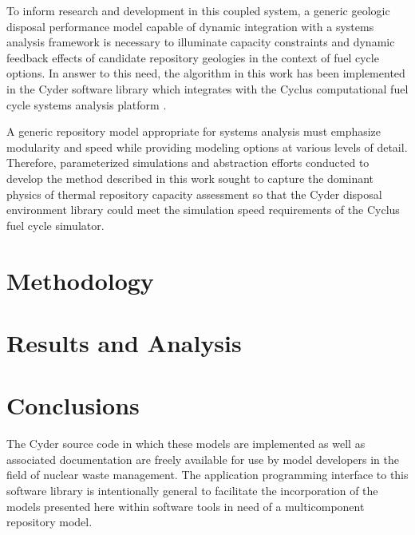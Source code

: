 \documentclass{anstrans}
\begin{document}


To inform research and development in this coupled system, a generic geologic disposal 
performance model capable of dynamic integration with a systems analysis 
framework is necessary to illuminate capacity constraints and dynamic feedback 
effects of candidate repository geologies in the context of fuel cycle options.
In answer to this need, the algorithm in this work has been implemented in the 
Cyder software library which integrates with the Cyclus computational 
fuel cycle systems analysis platform \cite{huff_cyder_2013,wilson_cyclus:_2012}. 

A generic repository model appropriate for systems analysis must emphasize 
modularity and speed while providing modeling options at various levels of 
detail. Therefore, parameterized simulations and abstraction efforts conducted to develop 
the method described in this work sought to capture the dominant physics of 
thermal repository capacity assessment so that the Cyder disposal environment 
library could meet the simulation speed requirements of the Cyclus fuel cycle 
simulator.

\section{Methodology}









\section{Results and Analysis}


\section{Conclusions}
The Cyder source code in which these models are implemented as well as 
associated documentation are freely available for use by model developers in the 
field of nuclear waste management. The application programming interface to this 
software library is intentionally general to facilitate the incorporation of the 
models presented here within software tools in need of a multicomponent repository 
model.
\end{document}
